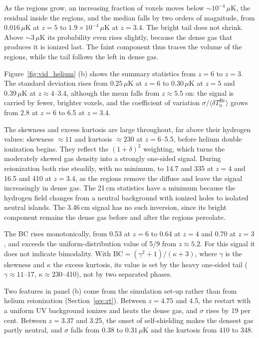 As the  regions grow, an increasing fraction of voxels moves below $\sim 10^{-4}\,\mu\mathrm{K}$, the residual  inside the  regions, and the median falls by two orders of magnitude, from $0.016\,\mu\mathrm{K}$ at $z = 5$ to $1.9\times10^{-4}\,\mu\mathrm{K}$ at $z = 3.4$. The bright tail does not shrink. Above $\sim 3\,\mu\mathrm{K}$ its probability even rises slightly, because the dense gas that produces it is ionized last. The faint component thus traces the volume of the  regions, while the tail follows the  left in dense gas.

Figure~\ref{fig:vid_helium} (b) shows the summary statistics from $z = 6$ to $z = 3$. The standard deviation rises from $0.25\,\mu\mathrm{K}$ at $z = 6$ to $0.30\,\mu\mathrm{K}$ at $z = 5$ and $0.39\,\mu\mathrm{K}$ at $z \approx 4$--3.4, although the mean falls from $z \approx 5.5$ on: the signal is carried by fewer, brighter voxels, and the coefficient of variation $\sigma/\langle\delta T_\mathrm{b}^\mathrm{He}\rangle$ grows from 2.8 at $z = 6$ to 6.5 at $z = 3.4$.

The skewness and excess kurtosis are large throughout, far above their hydrogen values: skewness $\approx 11$ and kurtosis $\approx 230$ at $z = 6$--5.5, before helium double ionization begins. They reflect the $(1+\delta)^2$ weighting, which turns the moderately skewed gas density into a strongly one-sided signal. During  reionization both rise steadily, with no minimum, to 14.7 and 335 at $z = 4$ and 16.5 and 410 at $z = 3.4$, as the  regions remove the diffuse  and leave the signal increasingly in dense gas. The 21\,cm statistics have a minimum because the hydrogen field changes from a neutral background with ionized holes to isolated neutral islands. The 3.46\,cm signal has no such inversion, since its bright component remains the dense gas before and after the  regions percolate.

The BC rises monotonically, from 0.53 at $z = 6$ to 0.64 at $z = 4$ and 0.70 at $z = 3$, and exceeds the uniform-distribution value of 5/9 from $z \approx 5.2$. For this signal it does not indicate bimodality. With $\mathrm{BC} = (\gamma^2 + 1)/(\kappa + 3)$, where $\gamma$ is the skewness and $\kappa$ the excess kurtosis, its value is set by the heavy one-sided tail ($\gamma \approx 11$--17, $\kappa \approx 230$--410), not by two separated phases.

Two features in panel (b) come from the simulation set-up rather than from helium reionization (Section~\ref{sec:rt}). Between $z = 4.75$ and 4.5, the restart with a uniform UV background ionizes and heats the dense gas, and $\sigma$ rises by 19 per cent. Between $z = 3.37$ and 3.25, the onset of self-shielding makes the densest gas partly neutral, and $\sigma$ falls from 0.38 to $0.31\,\mu\mathrm{K}$ and the kurtosis from 410 to 348.


